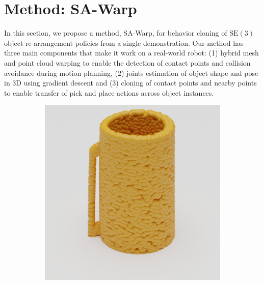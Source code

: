 \documentclass{article}
\begin{document}
\section{Method: SA-Warp}

In this section, we propose a method, SA-Warp, for behavior cloning of $\mathrm{SE(3)}$ object re-arrangement policies from a single demonstration. Our method has three main components that make it work on a real-world robot: (1) hybrid mesh and point cloud warping to enable the detection of contact points and collision avoidance during motion planning, (2) joints estimation of object shape and pose in 3D using gradient descent and (3) cloning of contact points and nearby points to enable transfer of pick and place actions across object instances.

\begin{figure}
    \centering
    \begin{subfigure}[b]{0.19\textwidth}
        \includegraphics[width=\textwidth]{figures/blender/warp3/11.png}
    \end{subfigure}
    \begin{subfigure}[b]{0.19\textwidth}

\end{subfigure}
\end{figure}
\end{document}
